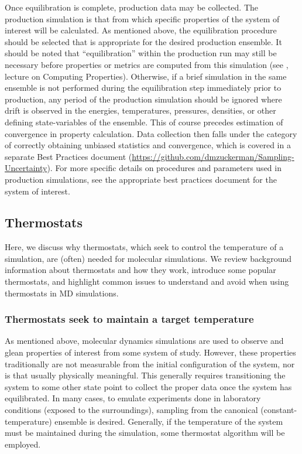 \documentclass[9pt,bestpractices]{livecoms}
\begin{document}
Once equilibration is complete, production data may be collected.
The production simulation is that from which specific properties of the system of interest will be calculated.
As mentioned above, the equilibration procedure should be selected that is appropriate for the desired production ensemble.
It should be noted that ``equilibration'' within the production run may still be necessary before properties or metrics are computed from this simulation (see \citet{ShellNotes}, lecture on Computing Properties).
Otherwise, if a brief simulation in the same ensemble is not performed during the equilibration step immediately prior to production, any period of the production simulation should be ignored where drift is observed in the energies, temperatures, pressures, densities, or other defining state-variables of the ensemble.
This of course precedes estimation of convergence in property calculation.
Data collection then falls under the category of correctly obtaining unbiased statistics and convergence, which is covered in a separate Best Practices document (\url{https://github.com/dmzuckerman/Sampling-Uncertainty}). 
For more specific details on procedures and parameters used in production simulations, see the appropriate best practices document for the system of interest.

\subsection{Thermostats}
\label{sec:thermostats}

Here, we discuss why thermostats, which seek to control the temperature of a simulation, are (often) needed for molecular simulations. 
We review background information about thermostats and how they work, introduce some popular thermostats, and highlight common issues to understand and avoid when using thermostats in MD simulations.

\subsubsection{Thermostats seek to maintain a target temperature}
As mentioned above, molecular dynamics simulations are used to observe and glean properties of interest from some system of study.
However, these properties traditionally are not measurable from the initial configuration of the system, nor is that usually physically meaningful.
This generally requires transitioning the system to some other state point to collect the proper data once the system has equilibrated.
In many cases, to emulate experiments done in laboratory conditions (exposed to the surroundings), sampling from the canonical (constant-temperature) ensemble is desired\cite{thermostatAlgorithms2005}.
Generally, if the temperature of the system must be maintained during the simulation, some thermostat algorithm will be employed. 
\end{document}

